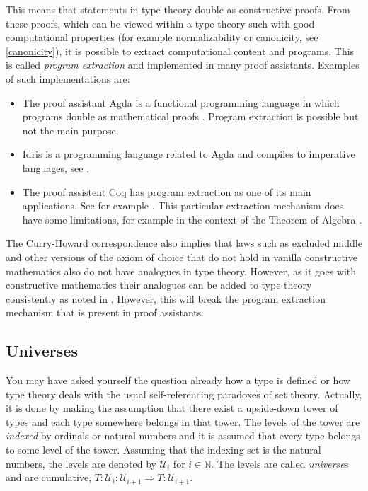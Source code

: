 \documentclass[11pt,a4paper,twoside,xetex,draft]{book}
\newcommand{\keyword}[1]{\emph{#1}\index{#1}}
\begin{document}
 
This means that statements in type theory double as constructive proofs. From these proofs, which can be viewed within a type theory such \cite{Martin-Loef1975} with good computational properties (for example normalizability or canonicity, see \cref{canonicity}), it is possible to extract computational content and programs. This is called \keyword{program extraction} and implemented in many proof assistants. Examples of such implementations are:
\begin{itemize}
\item The proof assistant Agda is a functional programming language in which programs double as mathematical proofs \cite{Abel2019}. Program extraction is possible but not the main purpose.
\item Idris is a programming language related to Agda and compiles to imperative languages, see \cite{Brady2018}.
\item   The proof assistent Coq \cite{Arias2019} has program extraction as one of its main applications. See for example \cite{Pit-Claudel2018}. This particular extraction mechanism does have some limitations, for example in the context of the Theorem of Algebra \cite{Cruz-Filipe2005}. %
\end{itemize}

%

The Curry-Howard correspondence also implies that laws such as excluded middle and other versions of the axiom of choice that do not hold in vanilla constructive mathematics also do not have analogues in type theory. However, as it goes with constructive mathematics their analogues can be added to type theory consistently as noted in \cite{Altenkirch2017}. However, this will break the program extraction mechanism that is present in proof assistants.

\subsection{Universes}\label{universes}

You may have asked yourself the question already how a type is defined or how type theory deals with the usual self-referencing paradoxes of set theory. Actually, it is done by making the assumption that there exist a upside-down tower of types and each type somewhere belongs in that tower. The levels of the tower are \keyword{indexed} by ordinals or natural numbers and it is assumed that every type belongs to some level of the tower. Assuming that the indexing set is the natural numbers, the levels are denoted by $\mathcal{U}_i$ for $i\in \mathbb{N}$. The levels are called \keyword{universe}s and are cumulative, $T: \mathcal{U}_i:\mathcal{U}_{i+1} \Rightarrow T : \mathcal{U}_{i+1}$. 
\end{document}

